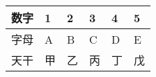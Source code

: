 \begin{tabularx}{\textwidth}{|c|Y|Y|Y|Y|Y|}
\hline
  数字 & 1 & 2 & 3 & 4 & 5 \\ \hline
  字母 & A & B & C & D & E \\ \hline
  天干 & 甲 & 乙 & 丙 & 丁 & 戊 \\
\hline
\end{tabularx}
